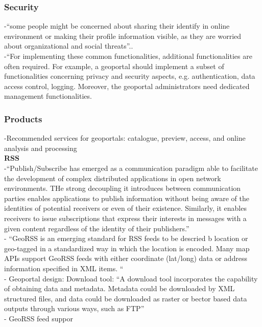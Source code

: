 \subsubsection{Security}
-{\color{orange}“some people might be concerned about sharing their identify in online environment or making their profile information visible, as they are worried about organizational and social threats”.}\cite{Afzalan2017}.\\
-{\color{orange}“For implementing these common functionalities, additional functionalities are often required. For example, a geoportal should implement a subset of functionalities concerning privacy and security aspects, e.g. authentication, data access control, logging. Moreover, the geoportal administrators need dedicated management functionalities. \cite{Jiang2020}}\\


\subsubsection{Products}
-{\color{orange}Recommended services for geoportals: catalogue, preview, access, and online analysis and processing \cite{Jiang2020}}\\
\textbf{RSS}\\
-{\color{orange}“Publish/Subscribe has emerged as a communication paradigm able to facilitate the development of complex distributed applications in open network environments. THe strong decoupling it introduces between communication parties enables applications to publish information without being aware of the identities of potential receivers or even of their existence.  Similarly, it enables receivers to issue subscriptions that express their interests in messages with a given content regardless of the identity of their publishers.”}\cite{Xing2015}\\
-{\color{orange} “GeoRSS is an emerging standard for RSS feeds to be descried b location or geo-tagged in a standardized way in which the location is encoded. Many map APIs support GeoRSS feeds with either coordinate (lat/long) data or address information specified in XML items. “}\cite{Xing2015}\\
-{\color{orange} Geoportal design: Download tool: ``A download tool incorporates the capability of obtaining data and metadata. Metadata could be downloaded by XML structured files, and data could be downloaded as raster or bector based data outputs through various ways, such as FTP'' \cite{Jiange2020}}\\
-{\color{orange} GeoRSS feed suppor \cite{Marshall2012}}\\

